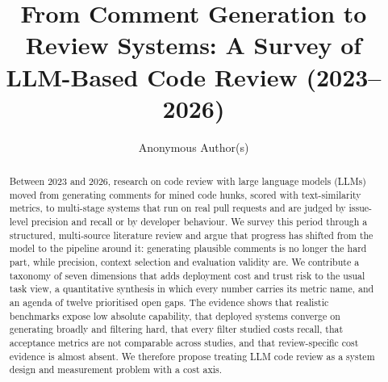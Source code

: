 \documentclass[runningheads]{llncs}
\begin{document}
\title{From Comment Generation to Review Systems: A Survey of LLM-Based Code Review (2023--2026)}
\author{Anonymous Author(s)}
\maketitle
\begin{abstract}
Between 2023 and 2026, research on code review with large language models (LLMs) moved from generating comments for mined code hunks, scored with text-similarity metrics, to multi-stage systems that run on real pull requests and are judged by issue-level precision and recall or by developer behaviour. We survey this period through a structured, multi-source literature review and argue that progress has shifted from the model to the pipeline around it: generating plausible comments is no longer the hard part, while precision, context selection and evaluation validity are. We contribute a taxonomy of seven dimensions that adds deployment cost and trust risk to the usual task view, a quantitative synthesis in which every number carries its metric name, and an agenda of twelve prioritised open gaps. The evidence shows that realistic benchmarks expose low absolute capability, that deployed systems converge on generating broadly and filtering hard, that every filter studied costs recall, that acceptance metrics are not comparable across studies, and that review-specific cost evidence is almost absent. We therefore propose treating LLM code review as a system design and measurement problem with a cost axis.
\end{abstract}














\end{document}
